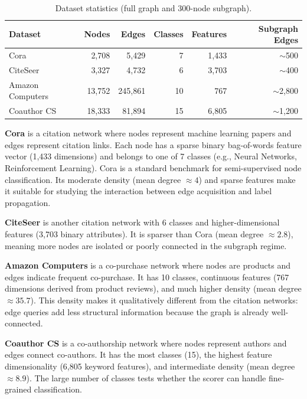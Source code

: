\documentclass[12pt,a4paper,oneside]{report}
\begin{document}
\begin{table}[htbp]
\centering
\caption{Dataset statistics (full graph and 300-node subgraph).}
\label{tab:datasets}
\small
\begin{tabular}{lrrrrr}
\toprule
Dataset & Nodes & Edges & Classes & Features & Subgraph Edges \\
\midrule
Cora & 2,708 & 5,429 & 7 & 1,433 & $\sim$500 \\
CiteSeer & 3,327 & 4,732 & 6 & 3,703 & $\sim$400 \\
Amazon Computers & 13,752 & 245,861 & 10 & 767 & $\sim$2,800 \\
Coauthor CS & 18,333 & 81,894 & 15 & 6,805 & $\sim$1,200 \\
\bottomrule
\end{tabular}
\end{table}

\textbf{Cora} \citep{cora_data} is a citation network where nodes represent machine learning papers and edges represent citation links. Each node has a sparse binary bag-of-words feature vector (1,433 dimensions) and belongs to one of 7 classes (e.g., Neural Networks, Reinforcement Learning). Cora is a standard benchmark for semi-supervised node classification. Its moderate density (mean degree $\approx 4$) and sparse features make it suitable for studying the interaction between edge acquisition and label propagation.

\textbf{CiteSeer} \citep{cora_data} is another citation network with 6 classes and higher-dimensional features (3,703 binary attributes). It is sparser than Cora (mean degree $\approx 2.8$), meaning more nodes are isolated or poorly connected in the subgraph regime.

\textbf{Amazon Computers} \citep{amazon_data} is a co-purchase network where nodes are products and edges indicate frequent co-purchase. It has 10 classes, continuous features (767 dimensions derived from product reviews), and much higher density (mean degree $\approx 35.7$). This density makes it qualitatively different from the citation networks: edge queries add less structural information because the graph is already well-connected.

\textbf{Coauthor CS} \citep{amazon_data} is a co-authorship network where nodes represent authors and edges connect co-authors. It has the most classes (15), the highest feature dimensionality (6,805 keyword features), and intermediate density (mean degree $\approx 8.9$). The large number of classes tests whether the scorer can handle fine-grained classification.
\end{document}

